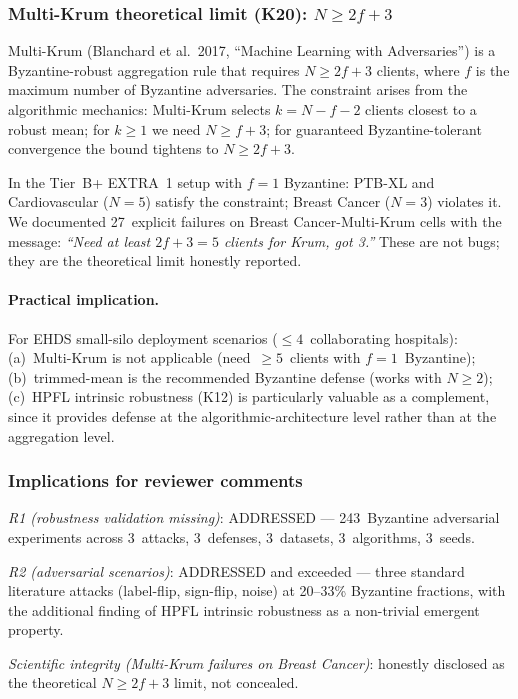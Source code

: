 \documentclass[conference]{IEEEtran}
\begin{document}
\subsubsection*{Multi-Krum theoretical limit (K20): $N{\geq}2f{+}3$}

Multi-Krum (Blanchard et al.~2017, ``Machine Learning with Adversaries'') is a Byzantine-robust aggregation rule that requires $N{\geq}2f{+}3$ clients, where $f$ is the maximum number of Byzantine adversaries. The constraint arises from the algorithmic mechanics: Multi-Krum selects $k{=}N{-}f{-}2$ clients closest to a robust mean; for $k{\geq}1$ we need $N{\geq}f{+}3$; for guaranteed Byzantine-tolerant convergence the bound tightens to $N{\geq}2f{+}3$.

In the Tier~B+ EXTRA~1 setup with $f{=}1$ Byzantine: PTB-XL and Cardiovascular ($N{=}5$) satisfy the constraint; Breast Cancer ($N{=}3$) violates it. We documented 27~explicit failures on Breast Cancer-Multi-Krum cells with the message: \emph{``Need at least $2f{+}3{=}5$ clients for Krum, got 3.''} These are not bugs; they are the theoretical limit honestly reported.

\paragraph{Practical implication.} For EHDS small-silo deployment scenarios ($\leq 4$~collaborating hospitals): (a)~Multi-Krum is not applicable (need~$\geq 5$~clients with $f{=}1$~Byzantine); (b)~trimmed-mean is the recommended Byzantine defense (works with $N{\geq}2$); (c)~HPFL intrinsic robustness (K12) is particularly valuable as a complement, since it provides defense at the algorithmic-architecture level rather than at the aggregation level.

\subsubsection*{Implications for reviewer comments}

\emph{R1 (robustness validation missing)}: ADDRESSED --- 243~Byzantine adversarial experiments across 3~attacks, 3~defenses, 3~datasets, 3~algorithms, 3~seeds.

\emph{R2 (adversarial scenarios)}: ADDRESSED and exceeded --- three standard literature attacks (label-flip, sign-flip, noise) at 20--33\% Byzantine fractions, with the additional finding of HPFL intrinsic robustness as a non-trivial emergent property.

\emph{Scientific integrity (Multi-Krum failures on Breast Cancer)}: honestly disclosed as the theoretical $N{\geq}2f{+}3$ limit, not concealed.
\end{document}
